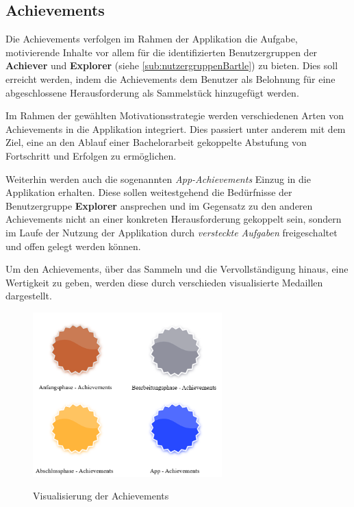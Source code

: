 \documentclass[bibliography=totoc,listof=totoc,BCOR=5mm,DIV=12,oneside]{scrbook}
\begin{document}
\subsection{Achievements} \label{sub:konzeptGamificationAchievements}
\par Die Achievements verfolgen im Rahmen der Applikation die Aufgabe, motivierende Inhalte vor allem für die identifizierten Benutzergruppen der \textbf{Achiever} und \textbf{Explorer} (siehe \ref{sub:nutzergruppenBartle}) zu bieten. Dies soll erreicht werden, indem die Achievements dem Benutzer als Belohnung für eine abgeschlossene Herausforderung als Sammelstück hinzugefügt werden.
\par \medskip Im Rahmen der gewählten Motivationsstrategie werden verschiedenen Arten von Achievements in die Applikation integriert. Dies passiert unter anderem mit dem Ziel, eine an den Ablauf einer Bachelorarbeit gekoppelte Abstufung von Fortschritt und Erfolgen zu ermöglichen. 
\par Weiterhin werden auch die sogenannten \textit{App-Achievements} Einzug in die Applikation erhalten. Diese sollen weitestgehend die Bedürfnisse der Benutzergruppe \textbf{Explorer} ansprechen und im Gegensatz zu den anderen Achievements nicht an einer konkreten Herausforderung gekoppelt sein, sondern im Laufe der Nutzung der Applikation durch \textit{versteckte Aufgaben} freigeschaltet und offen gelegt werden können.

\par \medskip Um den Achievements, über das Sammeln und die Vervollständigung hinaus, eine Wertigkeit zu geben, werden diese durch verschieden visualisierte Medaillen dargestellt. 

\bigskip
\begin{figure}[H]
\centering

	{\includegraphics[width=0.65\textwidth]{Bilder/AchievementsVisualisierung.png}}

	\caption{Visualisierung der Achievements}
	\label{img:achievements}
\end{figure}
\end{document}
